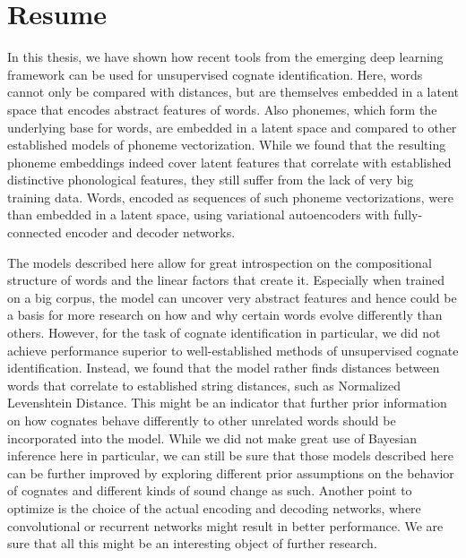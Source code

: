 \documentclass[6pt]{article}
\begin{document}
\section{Resume}

In this thesis, we have shown how recent tools from the emerging deep learning framework can be used for unsupervised cognate identification. Here, words cannot only be compared with distances, but are themselves embedded in a latent space that encodes abstract features of words. Also phonemes, which form the underlying base for words, are embedded in a latent space and compared to other established models of phoneme vectorization. While we found that the resulting phoneme embeddings indeed cover latent features that correlate with established distinctive phonological features, they still suffer from the lack of very big training data. Words, encoded as sequences of such phoneme vectorizations, were than embedded in a latent space, using variational autoencoders with fully-connected encoder and decoder networks. 

The models described here allow for great introspection on the compositional structure of words and the linear factors that create it. Especially when trained on a big corpus, the model can uncover very abstract features and hence could be a basis for more research on how and why certain words evolve differently than others. However, for the task of cognate identification in particular, we did not achieve performance superior to well-established methods of unsupervised cognate identification. Instead, we found that the model rather finds distances between words that correlate to established string distances, such as Normalized Levenshtein Distance. This might be an indicator that further prior information on how cognates behave differently to other unrelated words should be incorporated into the model.  While we did not make great use of Bayesian inference here in particular, we can still be sure that those models described here can be further improved by exploring different prior assumptions on the behavior of cognates and different kinds of sound change as such. Another point to optimize is the choice of the actual encoding and decoding networks, where convolutional or recurrent networks might result in better performance. We are sure that all this might be an interesting object of further research. 
\end{document}
